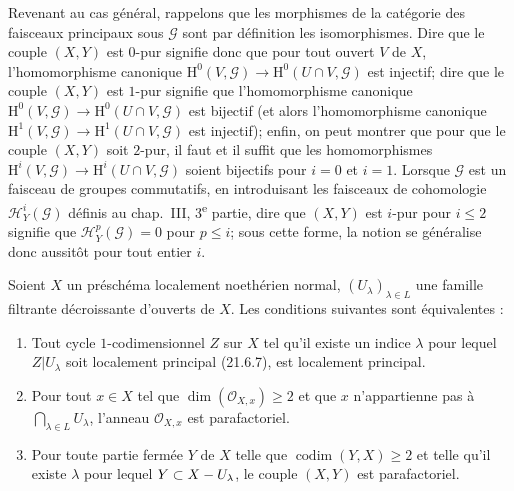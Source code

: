 \begin{remark}[21.13.13]
Revenant au cas général, rappelons que les morphismes de la catégorie des faisceaux
principaux sous $\mathscr G$ sont par définition les isomorphismes. Dire que le couple
$(X,Y)$ est $0$-pur signifie donc que pour tout ouvert $V$ de $X$, l'homomorphisme
canonique $\mathrm H^0(V,\mathscr G)\to\mathrm H^0(U\cap V,\mathscr G)$ est injectif;
dire que le couple $(X,Y)$ est $1$-pur signifie que l'homomorphisme canonique
$\mathrm H^0(V,\mathscr G)\to\mathrm H^0(U\cap V,\mathscr G)$ est bijectif (et alors
l'homomorphisme canonique
$\mathrm H^1(V,\mathscr G)\to\mathrm H^1(U\cap V,\mathscr G)$ est injectif); enfin,
on peut montrer que pour que le couple $(X,Y)$ soit $2$-pur, il faut et il suffit que
les homomorphismes
$\mathrm H^i(V,\mathscr G)\to\mathrm H^i(U\cap V,\mathscr G)$ soient bijectifs pour
$i=0$ et $i=1$. Lorsque $\mathscr G$ est un faisceau de groupes commutatifs, en
introduisant les faisceaux de cohomologie $\mathscr H_Y^i(\mathscr G)$ définis au
chap.~III, 3\textsuperscript{e} partie, dire que $(X,Y)$ est $i$-pur pour $i\leq2$
signifie que $\mathscr H_Y^p(\mathscr G)=0$ pour $p\leq i$; sous cette forme, la
notion se généralise donc aussitôt pour tout entier $i$.
\end{remark}

\begin{proposition}[21.13.14]
\label{IV.21.13.14}
Soient $X$ un préschéma localement noethérien normal,
$(U_\lambda)_{\lambda\in L}$ une famille filtrante décroissante d'ouverts de $X$. Les
conditions suivantes sont équivalentes :
\begin{enumerate}[label=\emph{\alph*)}]
  \item Tout cycle $1$-codimensionnel $Z$ sur $X$ tel qu'il existe un indice
  $\lambda$ pour lequel $Z|U_\lambda$ soit localement principal \textup{(21.6.7)}, est
  localement principal.
  \item Pour tout $x\in X$ tel que $\dim(\mathcal O_{X,x})\geq2$ et que $x$
  n'appartienne pas à $\bigcap_{\lambda\in L}U_\lambda$, l'anneau
  $\mathcal O_{X,x}$ est parafactoriel.
  \item[\textup{b$'$)}] Pour toute partie fermée $Y$ de $X$ telle que
$\operatorname{codim}(Y,X)\geq2$ et telle qu'il existe $\lambda$ pour lequel
$Y\subset X- U_\lambda$, le couple $(X,Y)$ est parafactoriel.
\end{enumerate}
\end{proposition}

